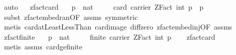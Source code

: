 \begin{isabellebody}
\ auto%
\endisatagproof
{\isafoldproof}%
%
\isadelimproof
\ \isanewline
%
\endisadelimproof
\isanewline
{}\isamarkupfalse%
\ zfact{\isacharunderscore}{\kern0pt}card{\isacharcolon}{\kern0pt}\isanewline
\ \ \ {\isachardoublequoteopen}{\isacharparenleft}{\kern0pt}p\ {\isacharcolon}{\kern0pt}{\isacharcolon}{\kern0pt}\ nat{\isacharparenright}{\kern0pt}\ {\isachargreater}{\kern0pt}\ {}{\isachardoublequoteclose}\isanewline
\ \ \ {\isachardoublequoteopen}card\ {\isacharparenleft}{\kern0pt}carrier\ {\isacharparenleft}{\kern0pt}ZFact\ {\isacharparenleft}{\kern0pt}int\ p{\isacharparenright}{\kern0pt}{\isacharparenright}{\kern0pt}{\isacharparenright}{\kern0pt}\ {\isacharequal}{\kern0pt}\ p{\isachardoublequoteclose}\isanewline
%
\isadelimproof
\ \ %
\endisadelimproof
%
\isatagproof
{}\isamarkupfalse%
\ {\isacharparenleft}{\kern0pt}subst\ zfact{\isacharunderscore}{\kern0pt}embed{\isacharunderscore}{\kern0pt}ran{\isacharbrackleft}{\kern0pt}OF\ assms{\isacharcomma}{\kern0pt}\ symmetric{\isacharbrackright}{\kern0pt}{\isacharparenright}{\kern0pt}\isanewline
\ \ \isamarkupfalse%
\ {\isacharparenleft}{\kern0pt}metis\ card{\isacharunderscore}{\kern0pt}atLeastLessThan\ card{\isacharunderscore}{\kern0pt}image\ diff{\isacharunderscore}{\kern0pt}zero\ zfact{\isacharunderscore}{\kern0pt}embed{\isacharunderscore}{\kern0pt}inj{\isacharbrackleft}{\kern0pt}OF\ assms{\isacharbrackright}{\kern0pt}{\isacharparenright}{\kern0pt}%
\endisatagproof
{\isafoldproof}%
%
\isadelimproof
\isanewline
%
\endisadelimproof
\isanewline
{}\isamarkupfalse%
\ zfact{\isacharunderscore}{\kern0pt}finite{\isacharcolon}{\kern0pt}\isanewline
\ \ \ {\isachardoublequoteopen}{\isacharparenleft}{\kern0pt}p\ {\isacharcolon}{\kern0pt}{\isacharcolon}{\kern0pt}\ nat{\isacharparenright}{\kern0pt}\ {\isachargreater}{\kern0pt}\ {}{\isachardoublequoteclose}\isanewline
\ \ \ {\isachardoublequoteopen}finite\ {\isacharparenleft}{\kern0pt}carrier\ {\isacharparenleft}{\kern0pt}ZFact\ {\isacharparenleft}{\kern0pt}int\ p{\isacharparenright}{\kern0pt}{\isacharparenright}{\kern0pt}{\isacharparenright}{\kern0pt}{\isachardoublequoteclose}\isanewline
%
\isadelimproof
\ \ %
\endisadelimproof
%
\isatagproof
{}\isamarkupfalse%
\ zfact{\isacharunderscore}{\kern0pt}card\ \isanewline
\ \ \isamarkupfalse%
\ {\isacharparenleft}{\kern0pt}metis\ assms\ card{\isacharunderscore}{\kern0pt}ge{\isacharunderscore}{\kern0pt}{}{\isacharunderscore}{\kern0pt}finite{\isacharparenright}{\kern0pt}%

\end{isabellebody}
